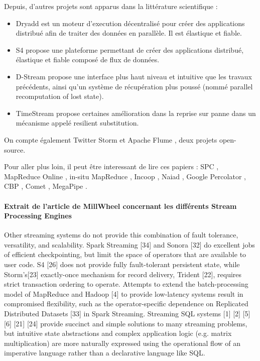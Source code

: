 \begin{refsection}
  Depuis, d'autres projets sont apparus dans la littérature scientifique :
  \begin{itemize}
    \item Dryadd \cite{Isard2007} est un moteur d'execution décentralisé pour créer des applications distribué afin de traiter des données en parallèle. Il est élastique et fiable.
    \item S4 \cite{Neumeyer2010} propose une plateforme permettant de créer des applications distribué, élastique et fiable composé de flux de données.
    \item D-Stream \cite{Zaharia2012} propose une interface plus haut niveau et intuitive que les travaux précédents, ainsi qu'un système de récupération plus poussé (nommé parallel recomputation of lost state).
    \item TimeStream \cite{Qian2013} propose certaines amélioration dans la reprise sur panne dans un mécanisme appelé resilient substitution.
  \end{itemize}
  On compte également Twitter Storm \cite{Marz2011} et Apache Flume \cite{Apache2011}, deux projets open-source.


  Pour aller plus loin, il peut être interessant de lire ces papiers :
  SPC \cite{Amini2006}, MapReduce Online \cite{Condie2010}, in-situ MapReduce \cite{Logothetis2011}, Incoop \cite{Bhatotia2011}, Naiad \cite{McSherry}, Google Percolator \cite{Peng2010}, CBP \cite{Logothetis2010}, Comet \cite{He2010}, MegaPipe \cite{Han2012}.

  \printbibliography[heading=subbibliography]
  \end{refsection}



\paragraph{Extrait de l'article de MillWheel concernant les différents Stream Processing Engines}

Other streaming systems do not provide this combination of fault tolerance, versatility, and scalability. Spark Streaming [34] and Sonora [32] do excellent jobs of efficient checkpointing, but limit the space of operators that are available to user code. S4 [26] does not provide fully fault-tolerant persistent state, while Storm's[23] exactly-once mechanism for record delivery, Trident [22], requires strict transaction ordering to operate. Attempts to extend the batch-processing model of MapReduce and Hadoop [4] to provide low-latency systems result in compromised flexibility, such as the operator-specific dependence on Replicated Distributed Datasets [33] in Spark Streaming. Streaming SQL systems [1] [2] [5] [6] [21] [24] provide succinct and simple solutions to many streaming problems, but intuitive state abstractions and complex application logic (e.g. matrix multiplication) are more naturally expressed using the operational flow of an imperative language rather than a declarative language like SQL.



